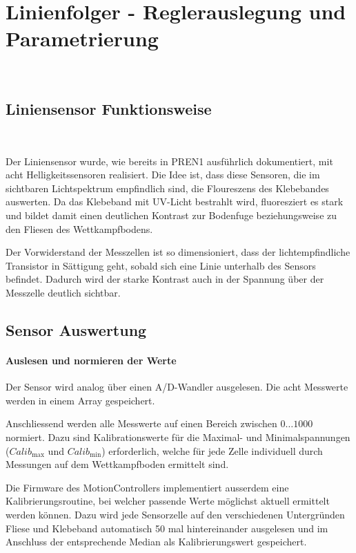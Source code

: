 \documentclass[main.tex]{subfiles} %
\begin{document}

\section{Linienfolger - Reglerauslegung und Parametrierung}~\label{apdx:LineFollowerRegler}

\subsection*{Liniensensor Funktionsweise}~\label{apdx:Liniensensor_auswertung}

Der Liniensensor wurde, wie bereits in PREN1 ausführlich dokumentiert, mit acht
Helligkeitssensoren realisiert. Die Idee ist, dass diese Sensoren, die im
sichtbaren Lichtspektrum empfindlich sind, die Floureszens des Klebebandes
auswerten. Da das Klebeband mit UV-Licht bestrahlt wird, fluoresziert es stark
und bildet damit einen deutlichen Kontrast zur Bodenfuge beziehungsweise zu den
Fliesen des Wettkampfbodens.


Der Vorwiderstand der Messzellen ist so dimensioniert, dass der
lichtempfindliche Transistor in Sättigung geht, sobald sich eine Linie
unterhalb des Sensors befindet. Dadurch wird der starke Kontrast auch in der
Spannung über der Messzelle deutlich sichtbar.

\subsection*{Sensor Auswertung}

\paragraph{Auslesen und normieren der Werte}

Der Sensor wird analog über einen A/D-Wandler ausgelesen. Die acht Messwerte
werden in einem Array gespeichert.

Anschliessend werden alle Messwerte auf einen Bereich zwischen $0 \dots 1000$
normiert. Dazu sind Kalibrationswerte für die Maximal- und Minimalspannungen
($Calib_{\max}$ und $Calib_{\min}$) erforderlich, welche für jede Zelle
individuell durch Messungen auf dem Wettkampfboden ermittelt sind.

Die Firmware des MotionControllers implementiert ausserdem eine
Kalibrierungsroutine, bei welcher passende Werte möglichst aktuell ermittelt
werden können. Dazu wird jede Sensorzelle auf den verschiedenen Untergründen
Fliese und Klebeband automatisch 50 mal hintereinander ausgelesen und im
Anschluss der entsprechende Median als Kalibrierungswert gespeichert.
\end{document}
